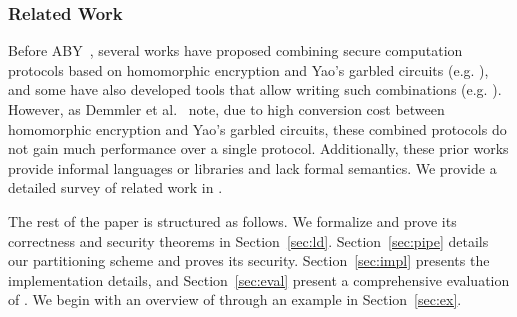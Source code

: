 \subsubsection*{Related Work}
Before ABY~\cite{aby}, several works have proposed
combining secure computation protocols based on homomorphic
encryption and Yao's garbled circuits
(e.g. \cite{barni,blanton,brickell,franz,huang,valeriaMatrix,valeriaRidge,schropferK11}),
and some have also developed tools that allow writing such
combinations (e.g. \cite{bogdanov,lone,tasty,autoS}). However, as Demmler et
al.~\cite{aby} note, due
 to high conversion cost between
homomorphic encryption and Yao's garbled circuits, these combined
protocols do not gain much performance over a single
protocol. 
Additionally, these prior works provide informal languages
or libraries and lack formal semantics.
 We provide a detailed survey of related
work in .

The rest of the paper is structured as follows. We formalize \tool and
prove its correctness and security theorems in
Section~\ref{sec:ld}. Section~\ref{sec:pipe} details our partitioning
scheme and proves its security. Section~\ref{sec:impl}
presents the implementation details, and
Section~\ref{sec:eval} present a comprehensive evaluation of \tool. We
begin with an overview of \tool through an example in
Section~\ref{sec:ex}. 





